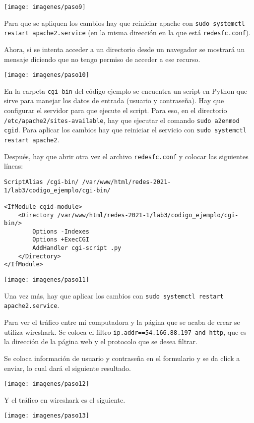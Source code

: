 \documentclass{article}
\begin{document}
\texttt{[image: imagenes/paso9]}

Para que se apliquen los cambios hay que reiniciar apache con \texttt{sudo systemctl restart apache2.service} (en la misma dirección en la que está \texttt{redesfc.conf}).

Ahora, si se intenta acceder a un directorio desde un navegador se mostrará un mensaje diciendo que no tengo permiso de acceder a ese recurso.

\texttt{[image: imagenes/paso10]}

En la carpeta \texttt{cgi-bin} del código ejemplo se encuentra un script en Python que sirve para manejar los datos de entrada (usuario y contraseña). Hay que configurar el servidor para que ejecute el script. Para eso, en el directorio \texttt{/etc/apache2/sites-available}, hay que ejecutar el comando \texttt{sudo a2enmod cgid}. Para aplicar los cambios hay que reiniciar el servicio con \texttt{sudo systemctl restart apache2}.

Después, hay que abrir otra vez el archivo \texttt{redesfc.conf} y colocar las siguientes líneas:

\begin{verbatim}
ScriptAlias /cgi-bin/ /var/www/html/redes-2021-1/lab3/codigo_ejemplo/cgi-bin/

<IfModule cgid-module>
    <Directory /var/www/html/redes-2021-1/lab3/codigo_ejemplo/cgi-bin/>
        Options -Indexes
        Options +ExecCGI
        AddHandler cgi-script .py
    </Directory>
</IfModule>
\end{verbatim}

\texttt{[image: imagenes/paso11]}

Una vez más, hay que aplicar los cambios con \texttt{sudo systemctl restart apache2.service}.

Para ver el tráfico entre mi computadora y la página que se acaba de crear se utiliza wireshark. Se coloca el filtro \texttt{ip.addr==54.166.88.197 and http}, que es la dirección de la página web y el protocolo que se desea filtrar.

Se coloca información de usuario y contraseña en el formulario y se da click a enviar, lo cual dará el siguiente resultado.

\texttt{[image: imagenes/paso12]}

Y el tráfico en wireshark es el siguiente.

\texttt{[image: imagenes/paso13]}
\end{document}
